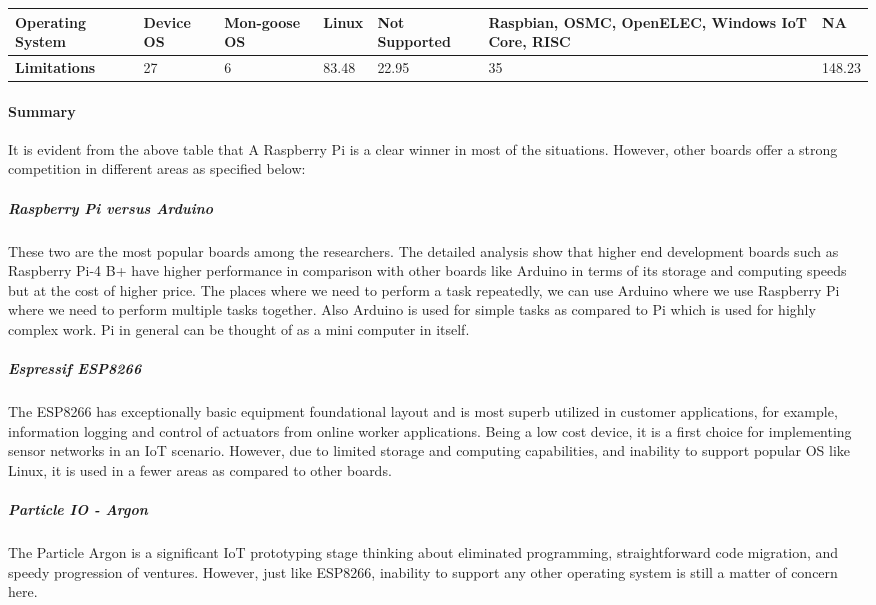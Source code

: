 \documentclass[a4paper,11pt]{article}
\begin{document}
\begin{iotsolution}
\begin{center}
\begin{longtable}{|p{2.2cm}|p{1.5cm}|p{1.5cm}|p{2.2cm}|p{2cm}|p{2cm}|p{2cm}|}
   \textbf{Operating System} & Device OS & Mon-goose OS & Linux  & Not Supported & Raspbian, OSMC, OpenELEC, Windows IoT Core, RISC & NA\\
 \hline
\textbf{Limitations} & 27 & 6 & 83.48 & 22.95 & 35 & 148.23\\
 \hline

\end{longtable}

\end{center}


\vspace{20}
\paragraph{\large{Summary}} It is evident from the above table that A Raspberry Pi is a clear winner in most of the situations. However, other boards offer a strong competition in different areas as specified below:

\subparagraph{Raspberry Pi versus Arduino}
These two are the most popular boards among the researchers. The  detailed
analysis  show  that  higher  end  development  boards  such  as
Raspberry Pi-4 B+ have higher performance in comparison with
other  boards  like  Arduino in  terms  of  its
storage and computing speeds but at the cost of higher price. The places where we need to perform a task repeatedly, we can use Arduino where we use Raspberry Pi where we need to perform multiple tasks together. Also Arduino is used for simple tasks as compared to Pi which is used for highly complex work. Pi in general can be thought of as a mini computer in itself.

\subparagraph{Espressif ESP8266}The ESP8266 has
exceptionally basic equipment foundational layout and is
most superb utilized in customer applications, for example,
information logging and control of actuators from online
worker applications. Being  a  low  cost  device, it  is  a  first  choice  for  implementing
sensor networks in an IoT scenario. However, due to limited storage and computing capabilities, and inability to support popular OS like Linux, it is used in a fewer areas as compared to other boards.

\subparagraph{Particle IO - Argon}The Particle Argon is a significant IoT prototyping stage thinking about eliminated programming, straightforward code migration, and speedy progression of ventures. However, just like ESP8266, inability to support any other operating system is still a matter of concern here.


\end{iotsolution}
\end{document}
